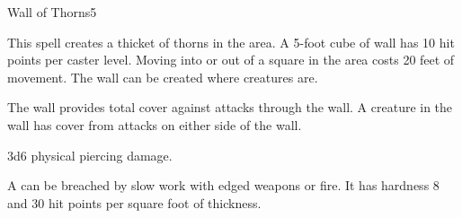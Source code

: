 \begin{spellsection}{Wall of Thorns}{5}
\begin{spellheader}
\end{spellheader}
\begin{spellcontent}
    \begin{spelltargetinginfo}
    \end{spelltargetinginfo}
    \begin{spelleffects}
        \spelleffect This spell creates a thicket of thorns in the area. A 5-foot cube of wall has 10 hit points per caster level. Moving into or out of a square in the area costs 20 feet of movement. The wall can be created where creatures are.

        The wall provides total cover against attacks through the wall. A creature in the wall has cover from attacks on either side of the wall.
        \spelldur \durlong \dismissable
    \end{spelleffects}
\end{spellcontent}
\begin{spellsubcontent}
    \begin{spelltargetinginfo}
    \end{spelltargetinginfo}
    \begin{spelleffects}
        \spelleffect 3d6 physical piercing damage.
    \end{spelleffects}
\end{spellsubcontent}
\begin{spellfooter}
    \spellnotes A  can be breached by slow work with edged weapons or fire. It has hardness 8 and 30 hit points per square foot of thickness.

    \physicalspellnotes
\end{spellfooter}
\end{spellsection}

